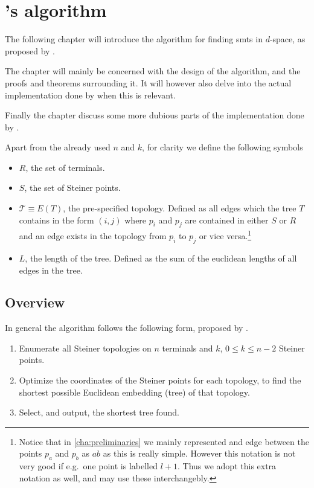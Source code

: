 { \abnormalparskip{0pt}
\chapter{\citeauthor{smith1992}'s algorithm}
\label{cha:algorithm} }


The following chapter will introduce the algorithm for finding \acp{smt} in
$d$-space, as proposed by \textcite{smith1992}.

The chapter will mainly be concerned with the design of the algorithm, and the
proofs and theorems surrounding it. It will however also delve into the actual
implementation done by \citeauthor{smith1992} when this is relevant.

Finally the chapter discuss some more dubious parts of the implementation done
by \citeauthor{smith1992}.

Apart from the already used $n$ and $k$, for clarity we define the following symbols
%
\begin{itemize}
\item $R$, the set of terminals.
\item $S$, the set of Steiner points.
\item $\mathcal{T} \equiv E(T)$, the pre-specified topology. Defined as all
  edges which the tree $T$ contains in the form $(i, j)$ where $p_i$ and
  $p_j$ are contained in either $S$ or $R$ and an edge exists in the
  topology from $p_i$ to $p_j$ or vice versa.\footnote{Notice that in
    \cref{cha:preliminaries} we mainly represented and edge between the points
    $p_a$ and $p_b$ as $ab$ as this is really simple. However this notation is not
    very good if e.g.\ one point is labelled $l+1$. Thus we adopt this extra
    notation as well, and may use these interchangebly.}
\item $L$, the length of the tree. Defined as the sum of the euclidean lengths
of all edges in the tree.
\end{itemize}

\section{Overview}
\label{sec:overview}

In general the algorithm follows the following form, proposed by \textcite{gilbert1968}.

\begin{enumerate}
\item Enumerate all Steiner topologies on $n$ terminals and $k$, $0 \le k \le
n-2$ Steiner points.
\item Optimize the coordinates of the Steiner points for each topology, to find
the shortest possible Euclidean embedding (tree) of that topology.
\item Select, and output, the shortest tree found.
\end{enumerate}

